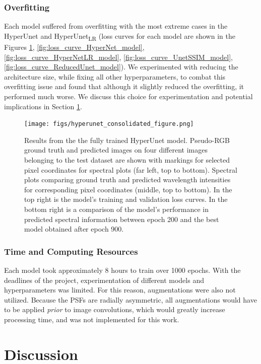 \documentclass{article}
\begin{document}
\subsubsection{Overfitting}
Each model suffered from overfitting with the most extreme cases in the HyperUnet and HyperUnet\textsubscript{LR} (loss curves for each model are shown in the Figures \ref{fig:HyperUnet_results}, \ref{fig:loss_curve_HyperNet_model}, \ref{fig:loss_curve_HyperNetLR_model}, \ref{fig:loss_curve_UnetSSIM_model}, \ref{fig:loss_curve_ReducedUnet_model}). We experimented with reducing the architecture size, while fixing all other hyperparameters, to combat this overfitting issue and found that although it slightly reduced the overfitting, it performed much worse. We discuss this choice for experimentation and potential implications in Section \ref{sec:discussion}.

\begin{figure}[!h]
\centering
\texttt{[image: figs/hyperunet\_consolidated\_figure.png]}
    \caption{Results from the the fully trained HyperUnet model. Pseudo-RGB ground truth and predicted images on four different images belonging to the test dataset are shown with markings for selected pixel coordinates for spectral plots (far left, top to bottom). Spectral plots comparing ground truth and predicted wavelength intensities for corresponding pixel coordinates (middle, top to bottom). In the top right is the model's training and validation loss curves. In the bottom right is a comparison of the model's performance in predicted spectral information between epoch 200 and the best model obtained after epoch 900.}
    \label{fig:HyperUnet_results}
\end{figure}

\subsubsection{Time and Computing Resources}
\label{sec:resourcelimitations}
Each model took approximately $8$ hours to train over 1000 epochs. With the deadlines of the project, experimentation of different models and hyperparameters was limited. For this reason, augmentations were also not utilized. Because the PSFs are radially asymmetric, all augmentations would have to be applied \textit{prior} to image convolutions, which would greatly increase processing time, and was not implemented for this work.

\section{Discussion}
\label{sec:discussion}
\end{document}
